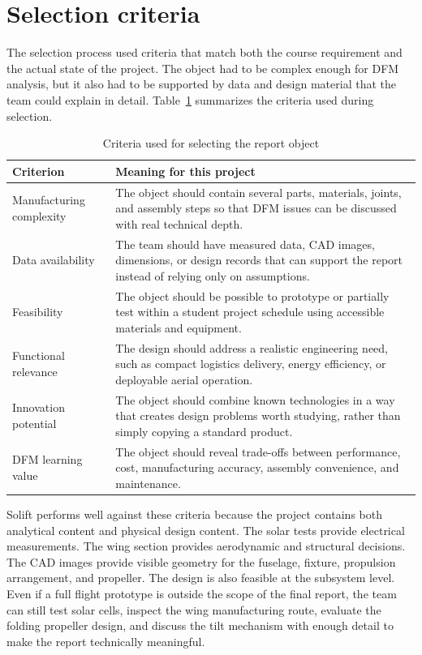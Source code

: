 \section{Selection criteria}
\label{subsec:selection-criteria}

The selection process used criteria that match both the course requirement and the actual state of the project. The object had to be complex enough for DFM analysis, but it also had to be supported by data and design material that the team could explain in detail. Table~\ref{tab:selection-criteria} summarizes the criteria used during selection.

\begin{table}[htbp]
    \centering
    \caption{Criteria used for selecting the report object}
    \label{tab:selection-criteria}
    \begin{tabular}{p{} p{}}
        \toprule
        Criterion & Meaning for this project \\
        \midrule
        Manufacturing complexity &
        The object should contain several parts, materials, joints, and assembly steps so that DFM issues can be discussed with real technical depth. \\
        Data availability &
        The team should have measured data, CAD images, dimensions, or design records that can support the report instead of relying only on assumptions. \\
        Feasibility &
        The object should be possible to prototype or partially test within a student project schedule using accessible materials and equipment. \\
        Functional relevance &
        The design should address a realistic engineering need, such as compact logistics delivery, energy efficiency, or deployable aerial operation. \\
        Innovation potential &
        The object should combine known technologies in a way that creates design problems worth studying, rather than simply copying a standard product. \\
        DFM learning value &
        The object should reveal trade-offs between performance, cost, manufacturing accuracy, assembly convenience, and maintenance. \\
        \bottomrule
    \end{tabular}
\end{table}

Solift performs well against these criteria because the project contains both analytical content and physical design content. The solar tests provide electrical measurements. The wing section provides aerodynamic and structural decisions. The CAD images provide visible geometry for the fuselage, fixture, propulsion arrangement, and propeller. The design is also feasible at the subsystem level. Even if a full flight prototype is outside the scope of the final report, the team can still test solar cells, inspect the wing manufacturing route, evaluate the folding propeller design, and discuss the tilt mechanism with enough detail to make the report technically meaningful.

